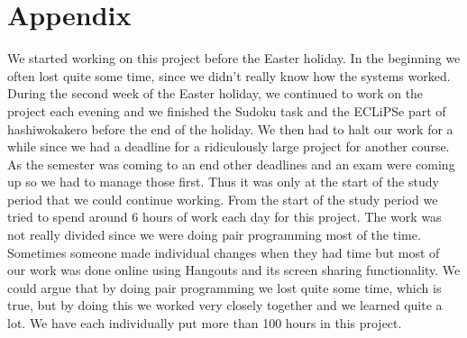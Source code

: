 \documentclass{report}
\newcommand{\mychapter}[2]{
    \setcounter{chapter}{#1}
    \setcounter{section}{0}
    \chapter*{#2}
    \addcontentsline{toc}{chapter}{#2}
}
\begin{document}
\mychapter{4}{Appendix}
We started working on this project before the Easter holiday. In the beginning we often lost quite some time, since we didn't really know how the systems worked. During the second week of the Easter holiday, we continued to work on the project each evening and we finished the Sudoku task and the ECLiPSe part of hashiwokakero before the end of the holiday. We then had to halt our work for a while since we had a deadline for a ridiculously large project for another course. As the semester was coming to an end other deadlines and an exam were coming up so we had to manage those first. Thus it was only at the start of the study period that we could continue working. From the start of the study period we tried to spend around 6 hours of work each day for this project. The work was not really divided since we were doing pair programming most of the time. Sometimes someone made individual changes when they had time but most of our work was done online using Hangouts and its screen sharing functionality. We could argue that by doing pair programming we lost quite some time, which is true, but by doing this we worked very closely together and we learned quite a lot. We have each individually put more than 100 hours in this project.
\end{document}
